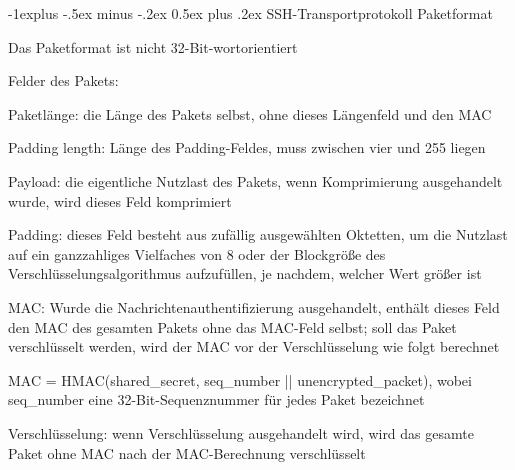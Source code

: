 \documentclass[a4paper]{article}
\makeatletter
\renewcommand{\subsection}{\@startsection{subsection}{2}{0mm}%
 {-1explus -.5ex minus -.2ex}%
 {0.5ex plus .2ex}%
 {\normalfont\normalsize\bfseries}}
\makeatother
\begin{document}
\begin{multicols}{3}
\begin{itemize*}
            \subsection{SSH-Transportprotokoll
                  Paketformat}
            \begin{itemize*}
                  \item Das Paketformat ist nicht 32-Bit-wortorientiert
                  \item Felder des Pakets:
                  \begin{itemize*}
                        \item Paketlänge: die Länge des Pakets selbst, ohne dieses Längenfeld und den MAC
                        \item Padding length: Länge des Padding-Feldes, muss zwischen vier und 255 liegen
                        \item Payload: die eigentliche Nutzlast des Pakets, wenn Komprimierung ausgehandelt wurde, wird dieses Feld komprimiert
                        \item Padding: dieses Feld besteht aus zufällig ausgewählten Oktetten, um die Nutzlast auf ein ganzzahliges Vielfaches von 8 oder der Blockgröße des Verschlüsselungsalgorithmus aufzufüllen, je nachdem, welcher Wert größer ist
                        \item MAC: Wurde die Nachrichtenauthentifizierung ausgehandelt, enthält dieses Feld den MAC des gesamten Pakets ohne das MAC-Feld selbst; soll das Paket verschlüsselt werden, wird der MAC vor der Verschlüsselung wie folgt berechnet
                        \begin{itemize*} \item MAC = HMAC(shared\_secret, seq\_number || unencrypted\_packet), wobei seq\_number eine 32-Bit-Sequenznummer für jedes Paket bezeichnet \end{itemize*}
                  \end{itemize*}
                  \item Verschlüsselung: wenn Verschlüsselung ausgehandelt wird, wird das
                  gesamte Paket ohne MAC nach der MAC-Berechnung verschlüsselt
            \end{itemize*}


\end{itemize*}
\end{multicols}
\end{document}

